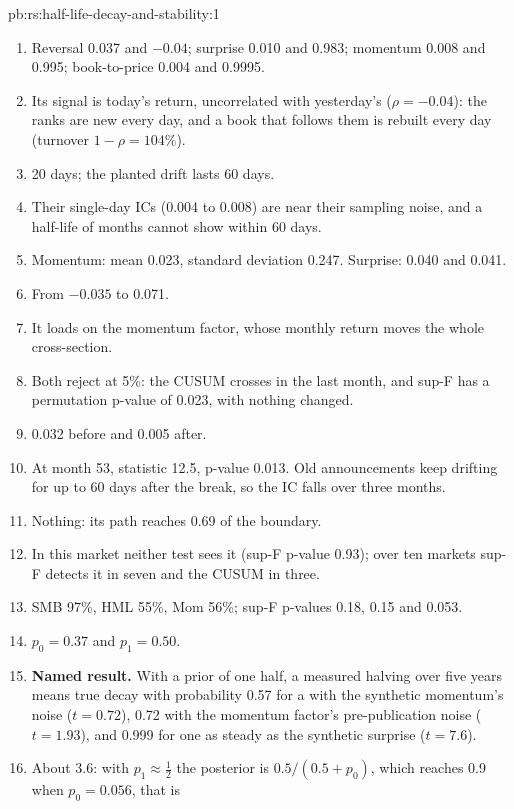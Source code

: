 \begin{solution}{pb:rs:half-life-decay-and-stability:1}
\begin{enumerate}
\item Reversal 0.037 and $-0.04$; surprise 0.010 and 0.983; momentum 0.008 and 0.995; book-to-price 0.004 and 0.9995.
\item Its signal is today's return, uncorrelated with yesterday's ($\rho = -0.04$): the ranks are new every day, and a book that follows them is
rebuilt every day (turnover $1 - \rho = 104\%$).
\item 20 days; the planted drift lasts 60 days.
\item Their single-day ICs (0.004 to 0.008) are near their sampling noise, and a half-life of months cannot show within 60 days.
\item Momentum: mean 0.023, standard deviation 0.247. Surprise: 0.040 and 0.041.
\item From $-0.035$ to 0.071.
\item It loads on the momentum factor, whose monthly return moves the whole cross-section.
\item Both reject at 5\%: the CUSUM crosses in the last month, and sup-F has a permutation p-value of 0.023, with nothing changed.
\item 0.032 before and 0.005 after.
\item At month 53, statistic 12.5, p-value 0.013. Old announcements keep drifting for up to 60 days after the break, so the IC falls over three
months.
\item Nothing: its path reaches 0.69 of the boundary.
\item In this market neither test sees it (sup-F p-value 0.93); over ten markets sup-F detects it in seven and the CUSUM in three.
\item SMB 97\%, HML 55\%, Mom 56\%; sup-F p-values 0.18, 0.15 and 0.053.
\item $p_0 = 0.37$ and $p_1 = 0.50$.
\item \textbf{Named result.} With a prior of one half, a measured halving over five years means true decay with probability 0.57 for a 
with the synthetic momentum's noise ($t = 0.72$), 0.72 with the momentum factor's pre-publication noise ($t = 1.93$), and 0.999 for one as steady as the
synthetic surprise ($t = 7.6$).
\item About 3.6: with $p_1 \approx \frac12$ the posterior is $0.5/(0.5 + p_0)$, which reaches 0.9 when $p_0 = 0.056$, that is

\end{enumerate}
\end{solution}
